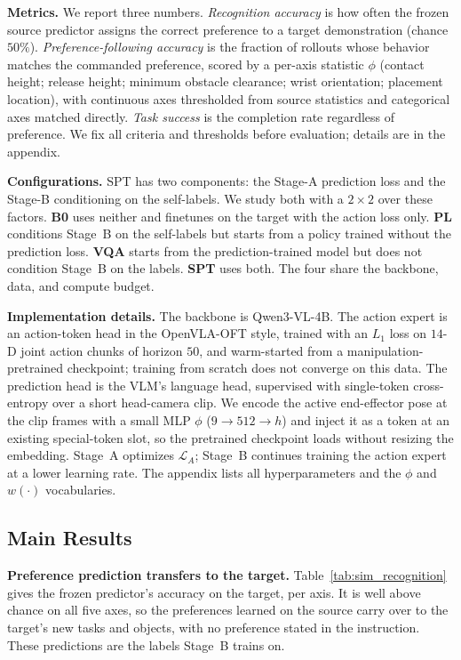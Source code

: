 \textbf{Metrics.}
We report three numbers. \emph{Recognition accuracy} is how often the frozen
source predictor assigns the correct preference to a target demonstration
(chance $50\%$). \emph{Preference-following accuracy} is the fraction of rollouts
whose behavior matches the commanded preference, scored by a per-axis statistic
$\phi$ (contact height; release height; minimum obstacle clearance; wrist
orientation; placement location), with continuous axes thresholded from source
statistics and categorical axes matched directly. \emph{Task success} is the
completion rate regardless of preference. We fix all criteria and thresholds
before evaluation; details are in the appendix.

\textbf{Configurations.}
SPT has two components: the Stage-A prediction loss and the Stage-B conditioning
on the self-labels. We study both with a $2\times2$ over these factors.
\textbf{B0} uses neither and finetunes on the target with the action loss only.
\textbf{PL} conditions Stage~B on the self-labels but starts from a policy
trained without the prediction loss. \textbf{VQA} starts from the
prediction-trained model but does not condition Stage~B on the labels.
\textbf{SPT} uses both. The four share the backbone, data, and compute budget.

\textbf{Implementation details.}
The backbone is Qwen3-VL-4B. The action expert is an action-token head in the
OpenVLA-OFT style, trained with an $L_1$ loss on $14$-D joint action chunks of
horizon $50$, and warm-started from a manipulation-pretrained checkpoint;
training from scratch does not converge on this data. The prediction head is the
VLM's language head, supervised with single-token cross-entropy over a short
head-camera clip. We encode the active end-effector pose at the clip frames with
a small MLP $\phi$ ($9\!\to\!512\!\to\!h$) and inject it as a token at an
existing special-token slot, so the pretrained checkpoint loads without resizing
the embedding. Stage~A optimizes $\mathcal{L}_A$; Stage~B continues training the
action expert at a lower learning rate. The appendix lists all hyperparameters
and the $\phi$ and $w(\cdot)$ vocabularies.

\subsection{Main Results}
\label{sec:exp-main}

\textbf{Preference prediction transfers to the target.}
Table~\ref{tab:sim_recognition} gives the frozen predictor's accuracy on the
target, per axis. It is well above chance on all five axes, so the preferences
learned on the source carry over to the target's new tasks and objects, with no
preference stated in the instruction. These predictions are the labels Stage~B
trains on.

